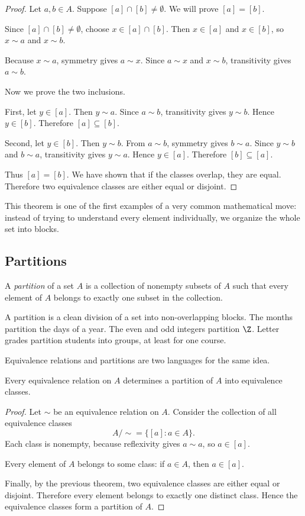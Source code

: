 \begin{proof}
Let $a,b\in A$. Suppose $[a]\cap[b]\neq\emptyset$. We will prove $[a]=[b]$.

Since $[a]\cap[b]\neq\emptyset$, choose $x\in[a]\cap[b]$. Then $x\in[a]$ and $x\in[b]$, so $x\sim a$ and $x\sim b$.

Because $x\sim a$, symmetry gives $a\sim x$. Since $a\sim x$ and $x\sim b$, transitivity gives $a\sim b$.

Now we prove the two inclusions.

First, let $y\in[a]$. Then $y\sim a$. Since $a\sim b$, transitivity gives $y\sim b$. Hence $y\in[b]$. Therefore $[a]\subseteq[b]$.

Second, let $y\in[b]$. Then $y\sim b$. From $a\sim b$, symmetry gives $b\sim a$. Since $y\sim b$ and $b\sim a$, transitivity gives $y\sim a$. Hence $y\in[a]$. Therefore $[b]\subseteq[a]$.

Thus $[a]=[b]$. We have shown that if the classes overlap, they are equal. Therefore two equivalence classes are either equal or disjoint.
\end{proof}

This theorem is one of the first examples of a very common mathematical move: instead of trying to understand every element individually, we organize the whole set into blocks.

\subsection{Partitions}

\begin{definition}
A \emph{partition} of a set $A$ is a collection of nonempty subsets of $A$ such that every element of $A$ belongs to exactly one subset in the collection.
\end{definition}

A partition is a clean division of a set into non-overlapping blocks. The months partition the days of a year. The even and odd integers partition $\Z$. Letter grades partition students into groups, at least for one course.

Equivalence relations and partitions are two languages for the same idea.

\begin{theorem}
Every equivalence relation on $A$ determines a partition of $A$ into equivalence classes.
\end{theorem}

\begin{proof}
Let $\sim$ be an equivalence relation on $A$. Consider the collection of all equivalence classes
\[
A/{\sim}=\{[a]:a\in A\}.
\]
Each class is nonempty, because reflexivity gives $a\sim a$, so $a\in[a]$.

Every element of $A$ belongs to some class: if $a\in A$, then $a\in[a]$.

Finally, by the previous theorem, two equivalence classes are either equal or disjoint. Therefore every element belongs to exactly one distinct class. Hence the equivalence classes form a partition of $A$.
\end{proof}

